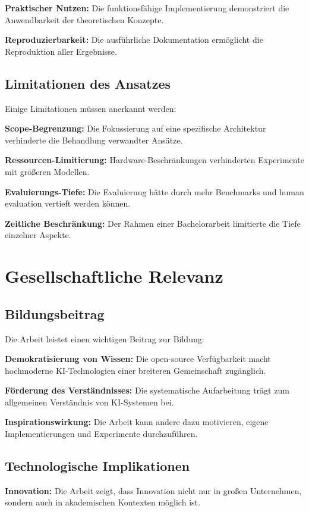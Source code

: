 \textbf{Praktischer Nutzen:} Die funktionsfähige Implementierung demonstriert die Anwendbarkeit der theoretischen Konzepte.

\textbf{Reproduzierbarkeit:} Die ausführliche Dokumentation ermöglicht die Reproduktion aller Ergebnisse.

\subsection{Limitationen des Ansatzes}

Einige Limitationen müssen anerkannt werden:

\textbf{Scope-Begrenzung:} Die Fokussierung auf eine spezifische Architektur verhinderte die Behandlung verwandter Ansätze.

\textbf{Ressourcen-Limitierung:} Hardware-Beschränkungen verhinderten Experimente mit größeren Modellen.

\textbf{Evaluierungs-Tiefe:} Die Evaluierung hätte durch mehr Benchmarks und human evaluation vertieft werden können.

\textbf{Zeitliche Beschränkung:} Der Rahmen einer Bachelorarbeit limitierte die Tiefe einzelner Aspekte.

\section{Gesellschaftliche Relevanz}

\subsection{Bildungsbeitrag}

Die Arbeit leistet einen wichtigen Beitrag zur Bildung:

\textbf{Demokratisierung von Wissen:} Die open-source Verfügbarkeit macht hochmoderne KI-Technologien einer breiteren Gemeinschaft zugänglich.

\textbf{Förderung des Verständnisses:} Die systematische Aufarbeitung trägt zum allgemeinen Verständnis von KI-Systemen bei.

\textbf{Inspirationswirkung:} Die Arbeit kann andere dazu motivieren, eigene Implementierungen und Experimente durchzuführen.

\subsection{Technologische Implikationen}

\textbf{Innovation:} Die Arbeit zeigt, dass Innovation nicht nur in großen Unternehmen, sondern auch in akademischen Kontexten möglich ist.

